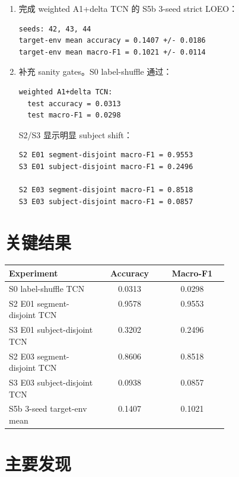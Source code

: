 \documentclass[UTF8,11pt]{ctexart}
\begin{document}
\begin{enumerate}
  \item 完成 weighted A1+delta TCN 的 S5b 3-seed strict LOEO：
\begin{verbatim}
seeds: 42, 43, 44
target-env mean accuracy = 0.1407 +/- 0.0186
target-env mean macro-F1 = 0.1021 +/- 0.0114
\end{verbatim}

  \item 补充 sanity gates。S0 label-shuffle 通过：
\begin{verbatim}
weighted A1+delta TCN:
  test accuracy = 0.0313
  test macro-F1 = 0.0298
\end{verbatim}
  S2/S3 显示明显 subject shift：
\begin{verbatim}
S2 E01 segment-disjoint macro-F1 = 0.9553
S3 E01 subject-disjoint macro-F1 = 0.2496

S2 E03 segment-disjoint macro-F1 = 0.8518
S3 E03 subject-disjoint macro-F1 = 0.0857
\end{verbatim}
\end{enumerate}

\section{关键结果}

\begin{center}
\begin{tabular}{>{\raggedright\arraybackslash}p{0.43\linewidth}cc}
\toprule
Experiment & Accuracy & Macro-F1 \\
\midrule
S0 label-shuffle TCN & 0.0313 & 0.0298 \\
S2 E01 segment-disjoint TCN & 0.9578 & 0.9553 \\
S3 E01 subject-disjoint TCN & 0.3202 & 0.2496 \\
S2 E03 segment-disjoint TCN & 0.8606 & 0.8518 \\
S3 E03 subject-disjoint TCN & 0.0938 & 0.0857 \\
S5b 3-seed target-env mean & 0.1407 & 0.1021 \\
\bottomrule
\end{tabular}
\end{center}

\section{主要发现}
\end{document}
